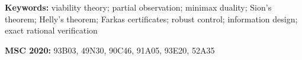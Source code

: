 \documentclass[11pt,a4paper]{article}
\theoremstyle{plain}
\theoremstyle{definition}
\theoremstyle{remark}
\newcommand{\tfr}[2]{\tfrac{#1}{#2}}
\begin{document}
\begin{abstract}
finite-horizon trajectories with adapted controls reproduces the review threshold $\tau^\ast=\tfr{7}{50}$ of a companion instance. Every number is regenerated by an exact rational script ($66$ checks); the soundness direction, the parity gap and the benchmark algebra are machine-checked in Lean~4.
\end{abstract}

\medskip
\noindent\textbf{Keywords:} viability theory; partial observation; minimax duality; Sion's theorem; Helly's theorem; Farkas certificates; robust control; information design; exact rational verification

\medskip
\noindent\textbf{MSC 2020:} 93B03, 49N30, 90C46, 91A05, 93E20, 52A35
\end{document}
